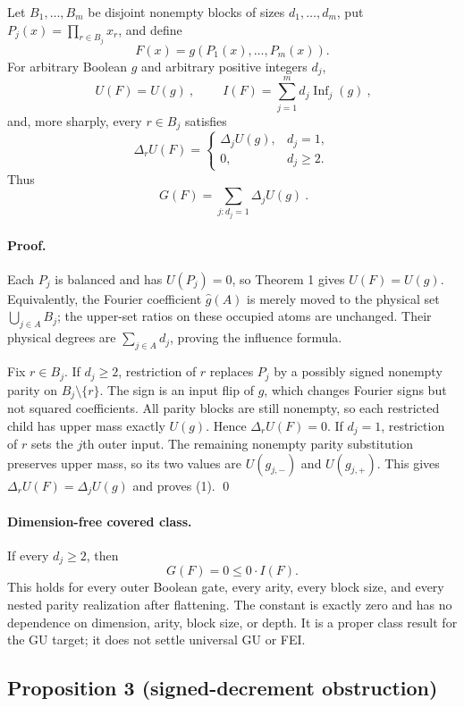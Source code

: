 Let $B_1,\ldots,B_m$ be disjoint nonempty blocks of sizes
$d_1,\ldots,d_m$, put $P_j(x)=\prod_{r\in B_j}x_r$, and define
\[
 F(x)=g(P_1(x),\ldots,P_m(x)).
\]
For arbitrary Boolean $g$ and arbitrary positive integers $d_j$,
\[
 \boxed{\ U(F)=U(g)\ },\qquad
 \boxed{\ I(F)=\sum_{j=1}^m d_j\operatorname{Inf}_j(g)\ },
\]
and, more sharply, every $r\in B_j$ satisfies
\[
 \boxed{
 \Delta_rU(F)=
 \begin{cases}
 \Delta_jU(g),&d_j=1,\\
 0,&d_j\ge2.
 \end{cases}}
\]
Thus
\[
 \boxed{\ G(F)=\sum_{j:d_j=1}\Delta_jU(g)\ }.                 \tag{1}
\]

\paragraph{Proof.}
Each $P_j$ is balanced and has $U(P_j)=0$, so Theorem 1 gives $U(F)=U(g)$.
Equivalently, the Fourier coefficient $\widehat g(A)$ is merely moved to
the physical set $\bigcup_{j\in A}B_j$; the upper-set ratios on these
occupied atoms are unchanged.  Their physical degrees are
$\sum_{j\in A}d_j$, proving the influence formula.

Fix $r\in B_j$.  If $d_j\ge2$, restriction of $r$ replaces $P_j$ by a
possibly signed nonempty parity on $B_j\setminus\{r\}$.  The sign is an
input flip of $g$, which changes Fourier signs but not squared coefficients.
All parity blocks are still nonempty, so each restricted child has upper
mass exactly $U(g)$.  Hence $\Delta_rU(F)=0$.  If $d_j=1$, restriction of
$r$ sets the $j$th outer input.  The remaining nonempty parity substitution
preserves upper mass, so its two values are $U(g_{j,-})$ and $U(g_{j,+})$.
This gives $\Delta_rU(F)=\Delta_jU(g)$ and proves (1). \qed

\paragraph{Dimension-free covered class.}
If every $d_j\ge2$, then
\[
 G(F)=0\le 0\cdot I(F).
\]
This holds for every outer Boolean gate, every arity, every block size, and
every nested parity realization after flattening.  The constant is exactly
zero and has no dependence on dimension, arity, block size, or depth.  It is
a proper class result for the GU target; it does not settle universal GU or
FEI.

\subsection*{Proposition 3 (signed-decrement obstruction)}

